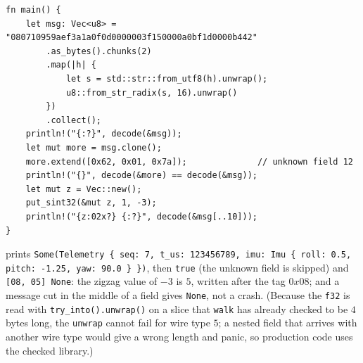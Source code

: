 \begin{enumerate}[label=\textbf{\ansnum.\arabic*}]
\begin{verbatim}
fn main() {
    let msg: Vec<u8> = "080710959aef3a1a0f0d0000003f150000a0bf1d0000b442"
        .as_bytes().chunks(2)
        .map(|h| {
            let s = std::str::from_utf8(h).unwrap();
            u8::from_str_radix(s, 16).unwrap()
        })
        .collect();
    println!("{:?}", decode(&msg));
    let mut more = msg.clone();
    more.extend([0x62, 0x01, 0x7a]);              // unknown field 12
    println!("{}", decode(&more) == decode(&msg));
    let mut z = Vec::new();
    put_sint32(&mut z, 1, -3);
    println!("{z:02x?} {:?}", decode(&msg[..10]));
}
\end{verbatim}
prints \verb!Some(Telemetry { seq: 7, t_us: 123456789, imu: Imu { roll: 0.5, pitch: -1.25, yaw: 90.0 } })!, then \verb!true! (the unknown field is skipped) and \verb![08, 05] None!: the zigzag value of $-3$ is $5$, written after the tag $0x08$; and a message cut in the middle of a field gives \verb!None!, not a crash. (Because the \verb!f32! is read with \verb!try_into().unwrap()! on a slice that \verb!walk! has already checked to be $4$ bytes long, the \verb!unwrap! cannot fail for wire type $5$; a nested field that arrives with another wire type would give a wrong length and panic, so production code uses the checked library.)
\end{enumerate}
